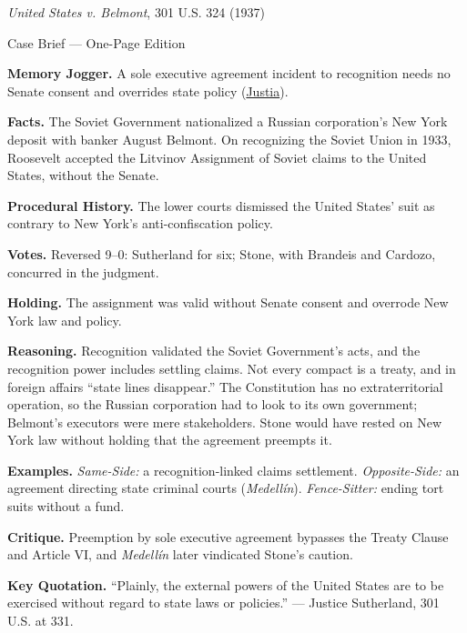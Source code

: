 \documentclass[12pt]{article}
\begin{document}
\begin{center}
{\Large \textit{United States v. Belmont}, 301 U.S. 324 (1937)\par}
\vspace{0.3em}
{\normalsize Case Brief --- One-Page Edition\par}
\end{center}

\textbf{Memory Jogger.} A sole executive agreement incident to recognition needs no Senate consent and overrides state policy (\href{https://supreme.justia.com/cases/federal/us/301/324/}{Justia}).

\textbf{Facts.} The Soviet Government nationalized a Russian corporation's New York deposit with banker August Belmont. On recognizing the Soviet Union in 1933, Roosevelt accepted the Litvinov Assignment of Soviet claims to the United States, without the Senate.

\textbf{Procedural History.} The lower courts dismissed the United States' suit as contrary to New York's anti-confiscation policy.

\textbf{Votes.} Reversed 9--0: Sutherland for six; Stone, with Brandeis and Cardozo, concurred in the judgment.

\textbf{Holding.} The assignment was valid without Senate consent and overrode New York law and policy.

\textbf{Reasoning.} Recognition validated the Soviet Government's acts, and the recognition power includes settling claims. Not every compact is a treaty, and in foreign affairs ``state lines disappear.'' The Constitution has no extraterritorial operation, so the Russian corporation had to look to its own government; Belmont's executors were mere stakeholders. Stone would have rested on New York law without holding that the agreement preempts it.

\textbf{Examples.} \emph{Same-Side:} a recognition-linked claims settlement. \emph{Opposite-Side:} an agreement directing state criminal courts (\textit{Medell\'in}). \emph{Fence-Sitter:} ending tort suits without a fund.

\textbf{Critique.} Preemption by sole executive agreement bypasses the Treaty Clause and Article VI, and \textit{Medell\'in} later vindicated Stone's caution.

\textbf{Key Quotation.} ``Plainly, the external powers of the United States are to be exercised without regard to state laws or policies.'' --- Justice Sutherland, 301 U.S. at 331.
\end{document}
